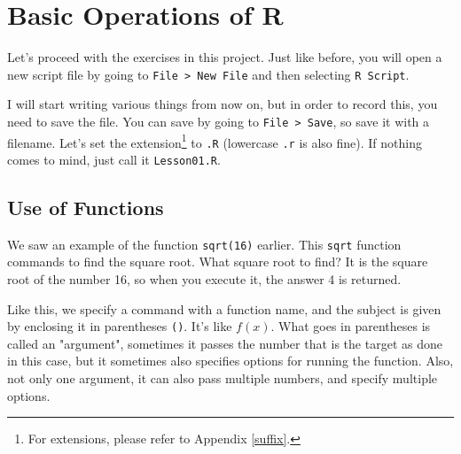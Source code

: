 \documentclass{ltjsbook}
\begin{document}
\section{Basic Operations of R}
Let's proceed with the exercises in this project.
Just like before, you will open a new script file by going to \verb|File > New File| and then selecting \verb|R Script|.

I will start writing various things from now on, but in order to record this, you need to save the file. You can save by going to \verb|File > Save|, so save it with a filename. Let's set the extension\footnote{For extensions, please refer to Appendix \ref{suffix}.} to \texttt{.R} (lowercase \texttt{.r} is also fine). If nothing comes to mind, just call it \texttt{Lesson01.R}.

\subsection{Use of Functions}
We saw an example of the function \texttt{sqrt(16)} earlier. This \texttt{sqrt} function commands to find the square root. What square root to find? It is the square root of the number 16, so when you execute it, the answer 4 is returned.

Like this, we specify a command with a function name, and the subject is given by enclosing it in parentheses \verb|()|. It's like $f(x)$. What goes in parentheses is called an "argument", sometimes it passes the number that is the target as done in this case, but it sometimes also specifies options for running the function. Also, not only one argument, it can also pass multiple numbers, and specify multiple options.
\end{document}
